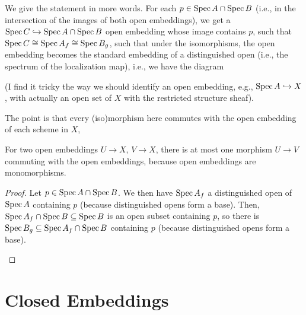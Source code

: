 \documentclass[12pt]{article}
\begin{document}
\begin{rmk}
    We give the statement in more words. For each $p\in \operatorname{Spec} A \cap \operatorname{Spec} B$ (i.e., in the intersection of the images of both open embeddings), we get a $\operatorname{Spec} C \hookrightarrow \operatorname{Spec} A \cap \operatorname{Spec} B$ open embedding whose image contains $p$, such that $\operatorname{Spec} C \cong \operatorname{Spec} A_f \cong \operatorname{Spec} B_g$, such that under the isomorphisms, the open embedding becomes the standard embedding of a distinguished open (i.e., the spectrum of the localization map), i.e., we have the diagram
    \begin{center}
    \end{center}
    (I find it tricky the way we should identify an open embedding, e.g., $\operatorname{Spec} A \hookrightarrow X$, with actually an open set of $X$ with the restricted structure sheaf).
    
    The point is that every (iso)morphism here commutes with the open embedding of each scheme in $X$,
\end{rmk}

\begin{rmk}
    For two open embeddings $U\to X$, $V\to X$, there is at most one morphism $U\to V$ commuting with the open embeddings, because open embeddings are monomorphisms.
\end{rmk}

\begin{proof}
    Let $p\in \operatorname{Spec} A \cap \operatorname{Spec} B$. We then have $\operatorname{Spec} A_f$ a distinguished open of $\operatorname{Spec} A$ containing $p$ (because distinguished opens form a base). Then, $\operatorname{Spec} A_f \cap \operatorname{Spec} B \subseteq \operatorname{Spec} B$ is an open subset containing $p$, so there is $\operatorname{Spec} B_g \subseteq \operatorname{Spec} A_f \cap \operatorname{Spec} B$ containing $p$ (because distinguished opens form a base).

    \begin{center}
    \end{center}
\end{proof}

\section{Closed Embeddings}
\end{document}

